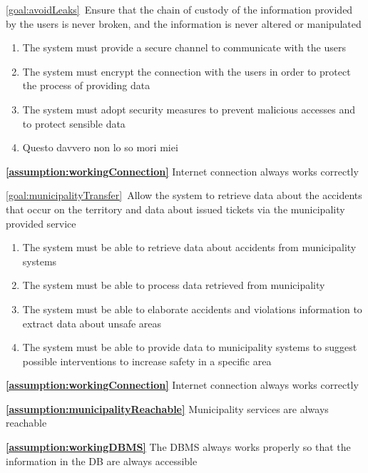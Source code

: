 \begin{description}
		\item \ref{goal:avoidLeaks}\ Ensure that the chain of custody of the information provided by the users is never broken, and the information is never altered or manipulated			
			\begin{enumerate}[resume*]
   				\item The system must provide a secure channel to communicate with the users
   				\item The system must encrypt the connection with the users in order to protect the process of providing data
   				\item The system must adopt security measures to prevent malicious accesses and to protect sensible data
   				\item Questo davvero non lo so mori miei
  			\end{enumerate}
			\textbf{\ref{assumption:workingConnection}} Internet connection always works correctly
			
		\item \ref{goal:municipalityTransfer}\ Allow the system to retrieve data about the accidents that occur on the territory and data about issued tickets via the municipality provided service
			\begin{enumerate}[resume*]
   				\item The system must be able to retrieve data about accidents from municipality systems 
   				\item The system must be able to process data retrieved from municipality
   				\item The system must be able to elaborate accidents and violations information to extract data about unsafe areas
   				\item The system must be able to provide data to municipality systems to suggest possible interventions to increase safety in a specific area
  			\end{enumerate}
  			
  			\textbf{\ref{assumption:workingConnection}} Internet connection always works correctly
  			
			\textbf{\ref{assumption:municipalityReachable}} Municipality services are always reachable
			
  			\textbf{\ref{assumption:workingDBMS}} The DBMS always works properly so that the information in the DB are always accessible
  			

\end{description}
